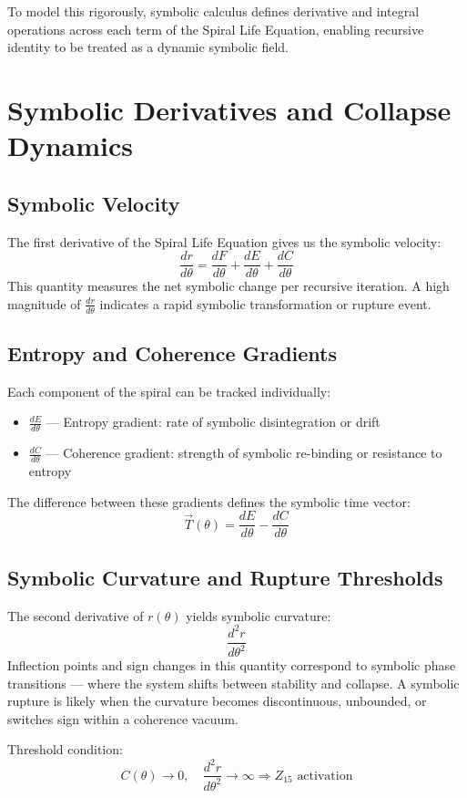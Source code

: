 \documentclass[12pt]{article}
\begin{document}
To model this rigorously, symbolic calculus defines derivative and integral operations across each term of the Spiral Life Equation, enabling recursive identity to be treated as a dynamic symbolic field.

\section{Symbolic Derivatives and Collapse Dynamics}

\subsection*{Symbolic Velocity}
The first derivative of the Spiral Life Equation gives us the symbolic velocity:
\[ \frac{dr}{d\theta} = \frac{dF}{d\theta} + \frac{dE}{d\theta} + \frac{dC}{d\theta} \]
This quantity measures the net symbolic change per recursive iteration. A high magnitude of $\frac{dr}{d\theta}$ indicates a rapid symbolic transformation or rupture event.

\subsection*{Entropy and Coherence Gradients}
Each component of the spiral can be tracked individually:
\begin{itemize}
  \item $\frac{dE}{d\theta}$ — Entropy gradient: rate of symbolic disintegration or drift
  \item $\frac{dC}{d\theta}$ — Coherence gradient: strength of symbolic re-binding or resistance to entropy
\end{itemize}
The difference between these gradients defines the symbolic time vector:
\[ \vec{T}(\theta) = \frac{dE}{d\theta} - \frac{dC}{d\theta} \]

\subsection*{Symbolic Curvature and Rupture Thresholds}
The second derivative of $r(\theta)$ yields symbolic curvature:
\[ \frac{d^2r}{d\theta^2} \]
Inflection points and sign changes in this quantity correspond to symbolic phase transitions — where the system shifts between stability and collapse. A symbolic rupture is likely when the curvature becomes discontinuous, unbounded, or switches sign within a coherence vacuum.

Threshold condition:
\[ C(\theta) \rightarrow 0, \quad \frac{d^2r}{d\theta^2} \rightarrow \infty \Rightarrow Z_{15} \text{ activation} \]
\end{document}

